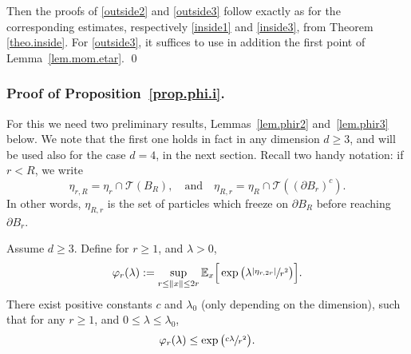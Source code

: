 Then the proofs of \eqref{outside2} and \eqref{outside3} follow exactly as for the corresponding estimates, respectively \eqref{inside1} and \eqref{inside3}, from Theorem \ref{theo.inside}. For \eqref{outside3}, it suffices to use in addition the first point of Lemma~\ref{lem.mom.etar}.
\qed

\subsubsection*{Proof of Proposition~\ref{prop.phi.i}.}
For this we need two preliminary results,
Lemmas~\ref{lem.phir2} and~\ref{lem.phir3} below.
We note that the first one holds in fact in any dimension $d\ge 3$,
and will be used also for the case $d=4$, in the next section. Recall two handy
notation: if $r<R$, we write
\[
\eta_{r,R}=\eta_r\cap \mathcal T(B_R),\quad\text{and}\quad
\eta_{R,r}=\eta_R\cap \mathcal T((\partial B_r)^c).
\]
In other words, $\eta_{R,r}$ is the set of particles which freeze on $\partial B_R$ before reaching $\partial B_r$.
\begin{lemma}\label{lem.phir2} Assume $d\ge 3$.
Define for $r\ge 1$, and $\lambda>0$,
\[
\varphi_r(\lambda):= \sup_{r\le \|x\|\le 2r}
\mathbb E_x \Big[\exp\big(\lambda\sfrac{|\eta_{r,2r}|}{r^2}\big)\Big].
\]
There exist positive constants $c$ and $\lambda_0$
(only depending on the dimension),
such that for any $r\ge 1$, and $0\le \lambda\le \lambda_0$,
\[
\varphi_r(\lambda) \le \exp\big(\sfrac{c\lambda}{r^2}\big).
\]
\end{lemma}

